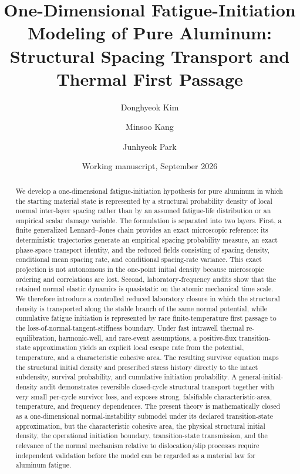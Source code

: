 \documentclass[11pt]{article}
\title{One-Dimensional Fatigue-Initiation Modeling of Pure Aluminum:\\Structural Spacing Transport and Thermal First Passage}
\author{Donghyeok Kim \and Minsoo Kang \and Junhyeok Park}
\date{Working manuscript, September 2026}
\begin{document}
\maketitle

\begin{abstract}
We develop a one-dimensional fatigue-initiation hypothesis for pure aluminum in which the starting material state is represented by a structural probability density of local normal inter-layer spacing rather than by an assumed fatigue-life distribution or an empirical scalar damage variable. The formulation is separated into two layers. First, a finite generalized Lennard--Jones chain provides an exact microscopic reference: its deterministic trajectories generate an empirical spacing probability measure, an exact phase-space transport identity, and the reduced fields consisting of spacing density, conditional mean spacing rate, and conditional spacing-rate variance. This exact projection is not autonomous in the one-point initial density because microscopic ordering and correlations are lost. Second, laboratory-frequency audits show that the retained normal elastic dynamics is quasistatic on the atomic mechanical time scale. We therefore introduce a controlled reduced laboratory closure in which the structural density is transported along the stable branch of the same normal potential, while cumulative fatigue initiation is represented by rare finite-temperature first passage to the loss-of-normal-tangent-stiffness boundary. Under fast intrawell thermal re-equilibration, harmonic-well, and rare-event assumptions, a positive-flux transition-state approximation yields an explicit local escape rate from the potential, temperature, and a characteristic cohesive area. The resulting survivor equation maps the structural initial density and prescribed stress history directly to the intact subdensity, survival probability, and cumulative initiation probability. A general-initial-density audit demonstrates reversible closed-cycle structural transport together with very small per-cycle survivor loss, and exposes strong, falsifiable characteristic-area, temperature, and frequency dependences. The present theory is mathematically closed as a one-dimensional normal-instability submodel under its declared transition-state approximation, but the characteristic cohesive area, the physical structural initial density, the operational initiation boundary, transition-state transmission, and the relevance of the normal mechanism relative to dislocation/slip processes require independent validation before the model can be regarded as a material law for aluminum fatigue.
\end{abstract}
\end{document}
